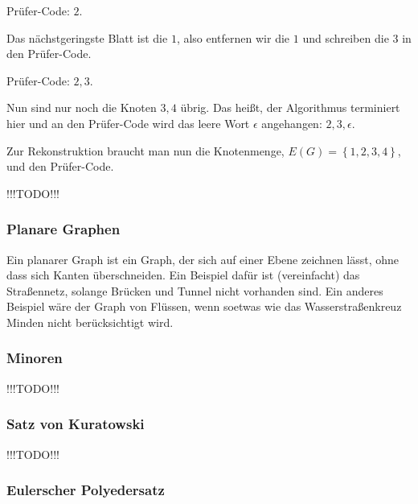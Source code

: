 \documentclass{scrartcl}
\newcommand{\TODO}{%
{\Huge\textcolor{HeavyRed}{\danger !!!TODO!!! \danger}}%
}
\begin{document}
Prüfer-Code: $2$.

Das nächstgeringste Blatt ist die $1$, also entfernen wir die $1$ und schreiben
die $3$ in den Prüfer-Code.


Prüfer-Code: $2, 3$.

Nun sind nur noch die Knoten $3, 4$ übrig. Das heißt, der Algorithmus terminiert hier
und an den Prüfer-Code wird das leere Wort $\epsilon$ angehangen: $2, 3, \epsilon$.

Zur Rekonstruktion braucht man nun die Knotenmenge, $E(G) = \left\{1, 2, 3, 4\right\}$, 
und den Prüfer-Code. 

\TODO

\subsubsection{Planare Graphen}

Ein planarer Graph ist ein Graph, der sich auf einer Ebene zeichnen lässt, ohne dass sich Kanten überschneiden.
Ein Beispiel dafür ist (vereinfacht) das Straßennetz, solange Brücken und Tunnel nicht vorhanden sind. Ein anderes
Beispiel wäre der Graph von Flüssen, wenn soetwas wie das Wasserstraßenkreuz Minden nicht berücksichtigt wird.

\subsubsection{Minoren}

\TODO

\subsubsection{Satz von Kuratowski}

\TODO

\subsubsection{Eulerscher Polyedersatz}
\end{document}
